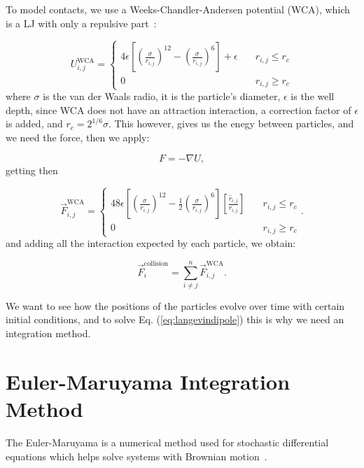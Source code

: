 To model contacts, we use a Weeks-Chandler-Andersen potential (WCA), which is a LJ with only a repulsive part~\cite{hess1999augmented}:

\begin{equation}
  U_{i,j}^{\mathrm{WCA}} = \begin{cases} 
    4\epsilon\left[ \left( \frac{\sigma}{r_{i,j}}\right)^{12} - \left( \frac{\sigma}{r_{i,j}}\right)^6\right] + \epsilon \quad &r_{i,j} \leq r_c \\
    0 \quad & r_{i,j} \geq r_c
  \end{cases}
  \label{eq:wcapotential}
\end{equation}
where $\sigma$ is the van der Waals radio, it is the particle's diameter, $\epsilon$ is the well depth, since WCA does not have an attraction interaction, a correction factor of $\epsilon$ is added, and $r_c = 2^{1/6}\sigma$. This however, gives us the enegy between particles, and we need the force, then we apply:

\begin{equation}
 F = - \nabla U, 
  \label{eq:negativegradient}
\end{equation}
getting then

\begin{equation}
  \vec{F}_{i,j}^{\mathrm{WCA}} = \begin{cases} 
    48\epsilon\left[ \left( \frac{\sigma}{r_{i,j}}\right)^{12} - \frac{1}{2}\left( \frac{\sigma}{r_{i,j}}\right)^6\right]\left[ \frac{\hat{r}_{i,j}}{r_{i,j}}\right] \quad &r_{i,j} \leq r_c \\
    0 \quad & r_{i,j} \geq r_c
  \end{cases}.
  \label{eq:wcaforce}
\end{equation}
and adding all the interaction expected by each particle, we obtain:

\begin{equation}
  \vec{F}^{\mathrm{collision}}_i = \sum^{n}_{i \neq j} \vec{F}^{\mathrm{WCA}}_{i,j}.  
  \label{eq:wcasum}
\end{equation}

We want to see how the positions of the particles evolve over time with certain initial conditions, and to solve Eq. (\ref{eq:langevindipole}) this is why we need an integration method.

\section{Euler-Maruyama Integration Method}
The Euler-Maruyama is a numerical method used for stochastic differential equations which helps solve systems with Brownian motion~\cite{platen2010numerical,higham2001algorithmic}.

